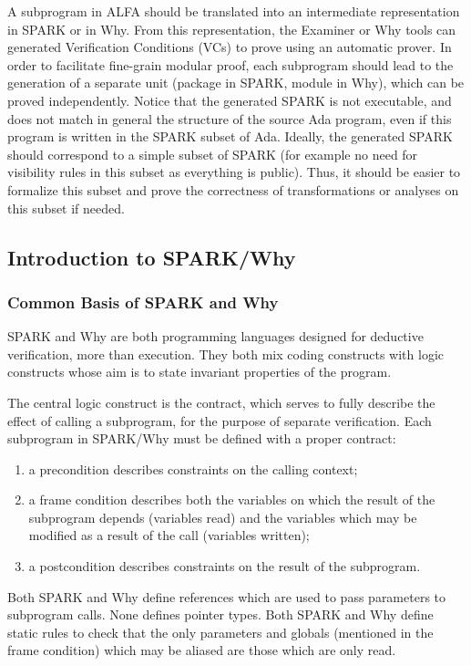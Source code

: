 \documentclass{article}
\newcounter{example}
\begin{document}
A subprogram in ALFA should be translated into an intermediate representation
in SPARK or in Why. From this representation, the Examiner or Why tools can
generated Verification Conditions (VCs) to prove using an automatic prover.  In
order to facilitate fine-grain modular proof, each subprogram should lead to
the generation of a separate unit (package in SPARK, module in Why), which can
be proved independently. Notice that the generated SPARK is not executable, and
does not match in general the structure of the source Ada program, even if this
program is written in the SPARK subset of Ada. Ideally, the generated SPARK
should correspond to a simple subset of SPARK (for example no need for
visibility rules in this subset as everything is public). Thus, it should be
easier to formalize this subset and prove the correctness of transformations or
analyses on this subset if needed.

\subsection{Introduction to SPARK/Why}

\subsubsection{Common Basis of SPARK and Why}

SPARK and Why are both programming languages designed for deductive
verification, more than execution. They both mix coding constructs with logic
constructs whose aim is to state invariant properties of the program.

The central logic construct is the contract, which serves to fully describe the
effect of calling a subprogram, for the purpose of separate verification. Each
subprogram in SPARK/Why must be defined with a proper contract:
\begin{enumerate}
\item a precondition describes constraints on the calling context;
\item a frame condition describes both the variables on which the result of the
  subprogram depends (variables read) and the variables which may be modified
  as a result of the call (variables written);
\item a postcondition describes constraints on the result of the subprogram.
\end{enumerate}

Both SPARK and Why define references which are used to pass parameters to
subprogram calls. None defines pointer types. Both SPARK and Why define static
rules to check that the only parameters and globals (mentioned in the frame
condition) which may be aliased are those which are only read.
\end{document}
